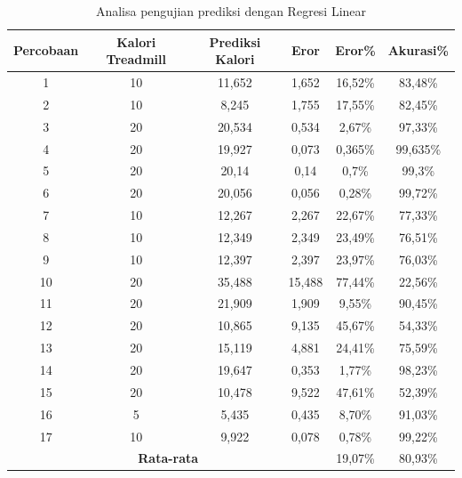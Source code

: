 \begin{longtable}{|c|c|c|c|c|c|}
  \caption{Analisa pengujian prediksi dengan Regresi Linear}
  \label{tb:AnalisaPrediksiRegresi}                                   \\
  \hline
  \rowcolor[HTML]{C0C0C0}
  \textbf{Percobaan} & \textbf{Kalori Treadmill} & \textbf{Prediksi Kalori} & \textbf{Eror} & \textbf{Eror\%} & \textbf{Akurasi\%} \\
  \hline
  1   & 10   & 11,652   & 1,652    & 16,52\%     & 83,48\%   \\
  \hline
  2   & 10   & 8,245    & 1,755    & 17,55\%     & 82,45\%   \\
  \hline
  3   & 20   & 20,534   & 0,534    & 2,67\%      & 97,33\%   \\
  \hline
  4   & 20   & 19,927   & 0,073    & 0,365\%     & 99,635\%  \\
  \hline
  5   & 20   & 20,14    & 0,14     & 0,7\%       & 99,3\%    \\
  \hline
  6   & 20   & 20,056   & 0,056    & 0,28\%      & 99,72\%   \\
  \hline
  7   & 10   & 12,267   & 2,267    & 22,67\%     & 77,33\%   \\
  \hline
  8   & 10   & 12,349   & 2,349    & 23,49\%     & 76,51\%   \\
  \hline
  9   & 10   & 12,397   & 2,397    & 23,97\%     & 76,03\%   \\
  \hline
  10   & 20   & 35,488   & 15,488   & 77,44\%     & 22,56\%   \\
  \hline
  11   & 20   & 21,909   & 1,909    & 9,55\%      & 90,45\%   \\
  \hline
  12   & 20   & 10,865   & 9,135    & 45,67\%     & 54,33\%   \\
  \hline
  13   & 20   & 15,119   & 4,881    & 24,41\%     & 75,59\%   \\
  \hline
  14   & 20   & 19,647   & 0,353    & 1,77\%      & 98,23\%   \\
  \hline
  15   & 20   & 10,478   & 9,522    & 47,61\%     & 52,39\%   \\
  \hline
  16   & 5   & 5,435    & 0,435     & 8,70\%      & 91,03\%   \\
  \hline
  17   & 10   & 9,922    & 0,078    & 0,78\%      & 99,22\%   \\
  \hline

  \multicolumn{4}{|c|}{\textbf{Rata-rata}} & 19,07\% & 80,93\% \\
  \hline
\end{longtable}

